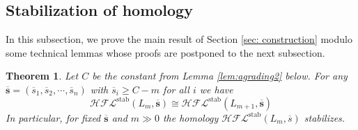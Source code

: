 \documentclass{amsart}
\newtheorem{theorem}{Theorem}[section]
\newcommand{\cHFL}{\mathcal{H\!F\! L}}
\newcommand{\ovl}{\overline}
\newcommand{\stab}{\mathrm{stab}}
\renewcommand{\ss}{\mathbf{s}}
\begin{document}
\subsection{Stabilization of homology}

In this subsection, we prove the main result of Section \ref{sec: construction} modulo some technical lemmas whose proofs  are postponed to the next subsection.  

\begin{theorem}
\label{thm: HFL stabilization}
Let $C$ be the constant from Lemma \ref{lem:agrading2} below.
For any $\ovl{\ss}=(\ovl{s}_1,\ovl{s}_2,\cdots,\ovl{s}_n)$ with $\ovl{s}_i\ge C-m$ for all $i$ we have
\[\cHFL^{\stab}(L_m,\ovl{\ss})\cong \cHFL^{\stab}\left(L_{m+1},\ovl{\ss}\right)\]
In particular, for fixed $\ovl{\ss}$ and $m\gg 0$ the homology $\cHFL^{\stab}(L_m,\ovl{s})$ stabilizes. 
\end{theorem}
\end{document}
